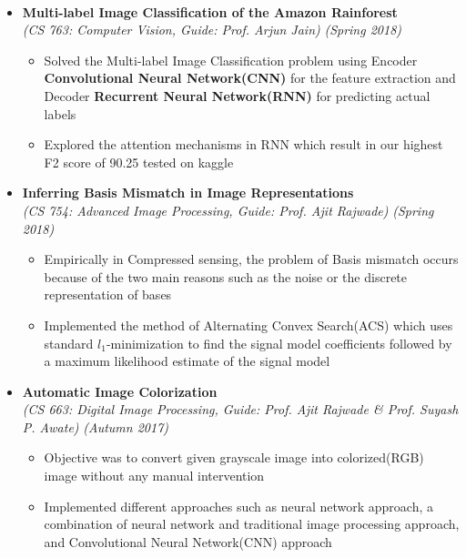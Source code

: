 \documentclass[a4paper,10pt]{article}
\newcommand{\isep}{-2 pt}
\begin{document}
\\[-0.3cm]
\begin{itemize}

\item \textbf{Multi-label Image Classification of the Amazon Rainforest} \\ \emph{(CS 763: Computer Vision, Guide: Prof. Arjun Jain)} \hfill {\emph{(Spring 2018)}}
    \\ [-0.6cm]
    \begin{itemize}\itemsep \isep
    \item Solved the Multi-label Image Classification problem using Encoder \textbf{Convolutional Neural Network(CNN)} for the feature extraction and Decoder \textbf{Recurrent Neural Network(RNN)} for predicting actual labels
    \item Explored the attention mechanisms in RNN which result in our highest F2 score of 90.25 tested on kaggle
    \end{itemize}

\item \textbf{Inferring Basis Mismatch in Image Representations} \\ {\emph{(CS 754: Advanced Image Processing, Guide: Prof. Ajit Rajwade)}} \hfill {\emph{(Spring 2018)}}
    \\ [-0.6cm]
    \begin{itemize}\itemsep \isep
    \item Empirically in Compressed sensing, the problem of Basis mismatch occurs because of the two main reasons such as the noise or the discrete representation of bases 
    \item Implemented the method of Alternating Convex Search(ACS) which uses standard $l_1$-minimization to find the signal model coefficients followed by a maximum likelihood estimate of the signal model
    \end{itemize}

\item \textbf{Automatic Image Colorization} \\
    {\emph{(CS 663: Digital Image Processing, Guide: Prof. Ajit Rajwade \& Prof. Suyash P. Awate)}} \hfill {\emph{(Autumn 2017)}}
    \\ [-0.6cm]
    \begin{itemize}\itemsep \isep
    \item Objective was to convert given grayscale image into colorized(RGB) image without any manual intervention
	\item Implemented different approaches such as neural network approach, a combination of neural network and traditional image processing approach, and Convolutional Neural Network(CNN) approach 
\end{itemize}


\end{itemize}
\end{document}
